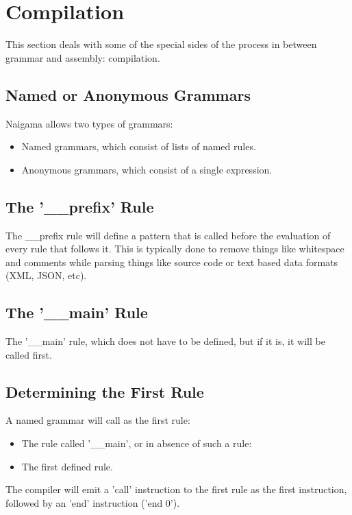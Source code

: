 \section{Compilation}

This section deals with some of the special sides of the process in
between grammar and assembly: compilation.

\subsection{Named or Anonymous Grammars}

Naigama allows two types of grammars:

\begin{itemize}
\item Named grammars, which consist of lists of named rules.
\item Anonymous grammars, which consist of a single expression.
\end{itemize}

\subsection{The '\_\_prefix' Rule}

The \_\_prefix rule will define a pattern that is called before
the evaluation of every rule that follows it. This is typically
done to remove things like whitespace and comments while parsing
things like source code or text based data formats (XML, JSON, etc).

\subsection{The '\_\_main' Rule}

The '\_\_main' rule, which does not have to be defined, but if it is,
it will be called first.

\subsection{Determining the First Rule}

A named grammar will call as the first rule:

\begin{itemize}
\item The rule called '\_\_main', or in absence of such a rule:
\item The first defined rule.
\end{itemize}

The compiler will emit a 'call' instruction to the first rule as the
first instruction, followed by an 'end' instruction ('end 0').
